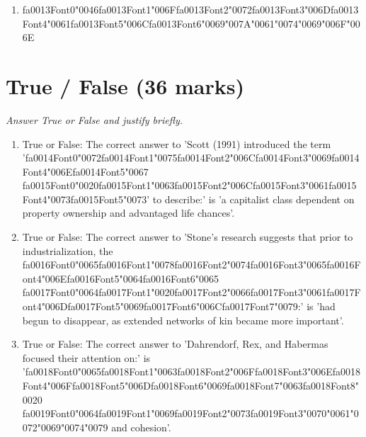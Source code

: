 \documentclass[12pt]{article}
\begin{document}
\begin{enumerate}[label=\arabic*.]
\begin{enumerate}[label=(\alph*)]
    \item {\csname fa0013Font0\endcsname\char"0046}{\csname fa0013Font1\endcsname\char"006F}{\csname fa0013Font2\endcsname\char"0072}{\csname fa0013Font3\endcsname\char"006D}{\csname fa0013Font4\endcsname\char"0061}{\csname fa0013Font5\endcsname\char"006C}{\csname fa0013Font6\endcsname\char"0069}{\char"007A}{\char"0061}{\char"0074}{\char"0069}{\char"006F}{\char"006E}
\end{enumerate}
\end{enumerate}

\section*{True / False (36 marks)}
\textit{Answer True or False and justify briefly.}
\begin{enumerate}[label=\arabic*.]
\item True or False: The correct answer to 'Scott (1991) introduced the term '{\csname fa0014Font0\endcsname\char"0072}{\csname fa0014Font1\endcsname\char"0075}{\csname fa0014Font2\endcsname\char"006C}{\csname fa0014Font3\endcsname\char"0069}{\csname fa0014Font4\endcsname\char"006E}{\csname fa0014Font5\endcsname\char"0067} {\csname fa0015Font0\endcsname\char"0020}{\csname fa0015Font1\endcsname\char"0063}{\csname fa0015Font2\endcsname\char"006C}{\csname fa0015Font3\endcsname\char"0061}{\csname fa0015Font4\endcsname\char"0073}{\csname fa0015Font5\endcsname\char"0073}' to describe:' is 'a capitalist class dependent on property ownership and advantaged life chances'.
\item True or False: The correct answer to 'Stone's research suggests that prior to industrialization, the {\csname fa0016Font0\endcsname\char"0065}{\csname fa0016Font1\endcsname\char"0078}{\csname fa0016Font2\endcsname\char"0074}{\csname fa0016Font3\endcsname\char"0065}{\csname fa0016Font4\endcsname\char"006E}{\csname fa0016Font5\endcsname\char"0064}{\csname fa0016Font6\endcsname\char"0065} {\csname fa0017Font0\endcsname\char"0064}{\csname fa0017Font1\endcsname\char"0020}{\csname fa0017Font2\endcsname\char"0066}{\csname fa0017Font3\endcsname\char"0061}{\csname fa0017Font4\endcsname\char"006D}{\csname fa0017Font5\endcsname\char"0069}{\csname fa0017Font6\endcsname\char"006C}{\csname fa0017Font7\endcsname\char"0079}:' is 'had begun to disappear, as extended networks of kin became more important'.
\item True or False: The correct answer to 'Dahrendorf, Rex, and Habermas focused their attention on:' is '{\csname fa0018Font0\endcsname\char"0065}{\csname fa0018Font1\endcsname\char"0063}{\csname fa0018Font2\endcsname\char"006F}{\csname fa0018Font3\endcsname\char"006E}{\csname fa0018Font4\endcsname\char"006F}{\csname fa0018Font5\endcsname\char"006D}{\csname fa0018Font6\endcsname\char"0069}{\csname fa0018Font7\endcsname\char"0063}{\csname fa0018Font8\endcsname\char"0020} {\csname fa0019Font0\endcsname\char"0064}{\csname fa0019Font1\endcsname\char"0069}{\csname fa0019Font2\endcsname\char"0073}{\csname fa0019Font3\endcsname\char"0070}{\char"0061}{\char"0072}{\char"0069}{\char"0074}{\char"0079} and cohesion'.

\end{enumerate}
\end{document}
